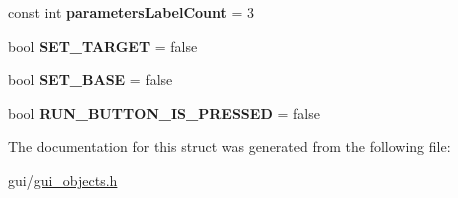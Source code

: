 \begin{DoxyCompactItemize}
const int {\bfseries parameters\+Label\+Count} = 3
\item 
\hypertarget{struct_main_window_objects_a8ecfc11bef148eccb169de602894f430}{}\label{struct_main_window_objects_a8ecfc11bef148eccb169de602894f430} 
bool {\bfseries S\+E\+T\+\_\+\+T\+A\+R\+G\+ET} = false
\item 
\hypertarget{struct_main_window_objects_afd2840313b5e375d9fc611433f881481}{}\label{struct_main_window_objects_afd2840313b5e375d9fc611433f881481} 
bool {\bfseries S\+E\+T\+\_\+\+B\+A\+SE} = false
\item 
\hypertarget{struct_main_window_objects_a33cf57580a48e05aa26084a2e885c56b}{}\label{struct_main_window_objects_a33cf57580a48e05aa26084a2e885c56b} 
bool {\bfseries R\+U\+N\+\_\+\+B\+U\+T\+T\+O\+N\+\_\+\+I\+S\+\_\+\+P\+R\+E\+S\+S\+ED} = false
\end{DoxyCompactItemize}


The documentation for this struct was generated from the following file\+:\begin{DoxyCompactItemize}
\item 
gui/\hyperlink{gui__objects_8h}{gui\+\_\+objects.\+h}\end{DoxyCompactItemize}
